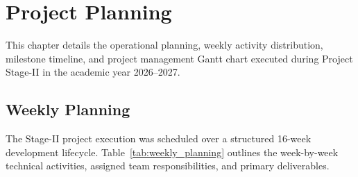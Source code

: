 \chapter{Project Planning}
\label{ch:project_planning}

This chapter details the operational planning, weekly activity distribution, milestone timeline, and project management Gantt chart executed during Project Stage-II in the academic year 2026--2027.

\section{Weekly Planning}
\label{sec:weekly_planning}

The Stage-II project execution was scheduled over a structured 16-week development lifecycle. Table~\ref{tab:weekly_planning} outlines the week-by-week technical activities, assigned team responsibilities, and primary deliverables.


